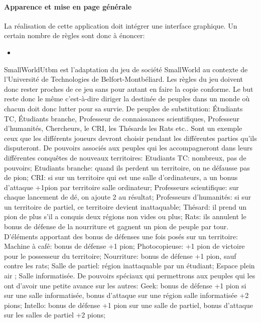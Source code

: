 \documentclass[a4paper, 11pt]{article}
\begin{document}
			\paragraph{Apparence et mise en page générale}
			
			La réalisation de cette application doit intégrer une interface graphique. Un certain nombre de règles sont donc à énoncer:
			\begin{itemize}
				\item 
			\end{itemize}
		
	
	SmallWorldUtbm est l'adaptation du jeu de société SmallWorld au contexte de l'Université de Technologies de Belfort-Montbéliard. Les règles du jeu doivent donc rester proches de ce jeu sans pour autant en faire la copie conforme. Le but reste donc le même c'est-à-dire diriger la destinée de peuples dans un monde où chacun doit donc lutter pour sa survie. 
De peuples de substitution: 
Étudiants TC, Étudiants branche, Professeur de connaissances scientifiques, Professeur d’humanités, Chercheurs, le CRI, les Thésards les Rats etc.. Sont un exemple ceux que les différents joueurs devront choisir pendant les différentes parties qu'ils disputeront.
De pouvoirs associés aux peuples qui les accompagneront dans leurs différentes conquêtes de nouveaux territoires: 
Etudiants TC: nombreux, pas de pouvoirs;
Etudiants branche: quand ils perdent un territoire, on ne défausse pas de pion;
CRI: si sur un territoire qui est une salle d’ordinateurs, a un bonus d’attaque +1pion par territoire salle ordinateur;
Professeurs scientifique: sur chaque lancement de dé, on ajoute 2 au résultat;
Professeurs d’humanités: si sur un territoire de partiel, ce territoire devient inattaquable;
Thésard: il prend un pion de plus s’il a conquis deux régions non vides ou plus;
Rats: ils annulent le bonus de défense de la nourriture et gagnent un pion de peuple par tour.
D'éléments apportant des bonus de défenses une fois posés sur un territoire:
Machine à café: bonus de défense +1 pion; 
Photocopieuse: +1 pion de victoire pour le possesseur du territoire;
Nourriture: bonus de défense +1 pion, sauf contre les rats;
Salle de partiel: région inattaquable par un étudiant;
Espace plein air ;
Salle informatisée.
De pouvoirs spéciaux qui permettrons aux peuples qui les ont d'avoir une petite avance sur les autres:
Geek: bonus de défense +1 pion si sur une salle informatisée, bonus d’attaque sur une région salle informatisée +2 pions;
Intello: bonus de défense +1 pion sur une salle de partiel, bonus d’attaque sur les salles de partiel +2 pions;
\end{document}
